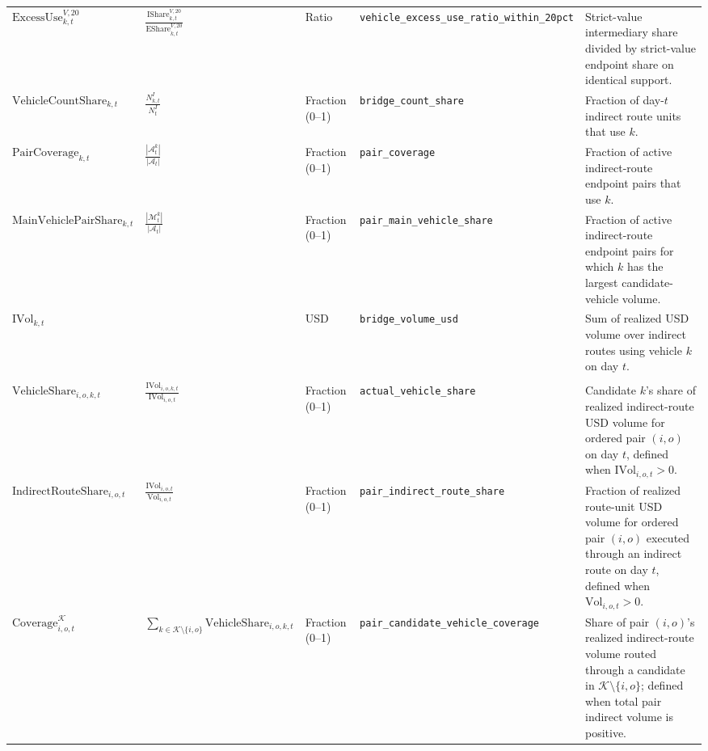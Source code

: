 \begin{tabularx}{\linewidth}{@{}>{\raggedright\arraybackslash}X>{\raggedright\arraybackslash}Xl>{\raggedright\arraybackslash}X>{\raggedright\arraybackslash}X@{}}
$\mathrm{ExcessUse}^{V,20}_{k,t}$ & $\displaystyle\frac{\mathrm{IShare}^{V,20}_{k,t}}{\mathrm{EShare}^{V,20}_{k,t}}$ & Ratio & \texttt{vehicle\_\allowbreak{}excess\_\allowbreak{}use\_\allowbreak{}ratio\_\allowbreak{}within\_\allowbreak{}20pct} & Strict-value intermediary share divided by strict-value endpoint share on identical support. \\
$\mathrm{VehicleCountShare}_{k,t}$ & $\displaystyle\frac{N^{I}_{k,t}}{N^{I}_{t}}$ & Fraction (0--1) & \texttt{bridge\_\allowbreak{}count\_\allowbreak{}share} & Fraction of day-$t$ indirect route units that use $k$. \\
$\mathrm{PairCoverage}_{k,t}$ & $\displaystyle\frac{|\mathcal A^{k}_{t}|}{|\mathcal A_t|}$ & Fraction (0--1) & \texttt{pair\_\allowbreak{}coverage} & Fraction of active indirect-route endpoint pairs that use $k$. \\
$\mathrm{MainVehiclePairShare}_{k,t}$ & $\displaystyle\frac{|\mathcal M^{k}_{t}|}{|\mathcal A_t|}$ & Fraction (0--1) & \texttt{pair\_\allowbreak{}main\_\allowbreak{}vehicle\_\allowbreak{}share} & Fraction of active indirect-route endpoint pairs for which $k$ has the largest candidate-vehicle volume. \\
$\mathrm{IVol}_{k,t}$ &  & USD & \texttt{bridge\_\allowbreak{}volume\_\allowbreak{}usd} & Sum of realized USD volume over indirect routes using vehicle $k$ on day $t$. \\
\addlinespace
\multicolumn{5}{@{}l}{\textit{Pair-level route-choice measures}} \\
$\mathrm{VehicleShare}_{i,o,k,t}$ & $\displaystyle\frac{\mathrm{IVol}_{i,o,k,t}}{\mathrm{IVol}_{i,o,t}}$ & Fraction (0--1) & \texttt{actual\_\allowbreak{}vehicle\_\allowbreak{}share} & Candidate $k$'s share of realized indirect-route USD volume for ordered pair $(i,o)$ on day $t$, defined when $\mathrm{IVol}_{i,o,t}>0$. \\
$\mathrm{IndirectRouteShare}_{i,o,t}$ & $\displaystyle\frac{\mathrm{IVol}_{i,o,t}}{\mathrm{Vol}_{i,o,t}}$ & Fraction (0--1) & \texttt{pair\_\allowbreak{}indirect\_\allowbreak{}route\_\allowbreak{}share} & Fraction of realized route-unit USD volume for ordered pair $(i,o)$ executed through an indirect route on day $t$, defined when $\mathrm{Vol}_{i,o,t}>0$. \\
$\mathrm{Coverage}^{\mathcal K}_{i,o,t}$ & $\displaystyle\sum_{k\in\mathcal K\setminus\{i,o\}}\mathrm{VehicleShare}_{i,o,k,t}$ & Fraction (0--1) & \texttt{pair\_\allowbreak{}candidate\_\allowbreak{}vehicle\_\allowbreak{}coverage} & Share of pair $(i,o)$'s realized indirect-route volume routed through a candidate in $\mathcal K\setminus\{i,o\}$; defined when total pair indirect volume is positive. \\

\end{tabularx}
